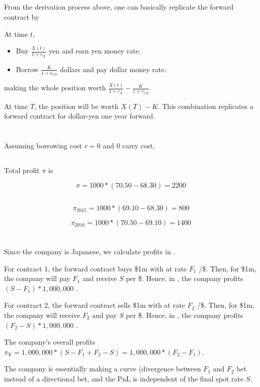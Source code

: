\documentclass[11pt]{scrartcl}
\begin{document}
\subsection{}

From the derivation process above, one can basically replicate the forward contract by 

At time $t$,
\begin{itemize}
\item Buy $\frac{X(t)}{1+r_X}$ yen and earn yen money rate.
\item Borrow $\frac{K}{1+r_{US}}$ dollars and pay dollar money rate.
\end{itemize}
making the whole position worth $\frac{X(t)}{1+r_X} - \frac{K}{1+r_{US}}$.

At time $T$, the position will be worth $X(T) - K$. This combination replicates a forward contract for dollar-yen one year forward.

\section{}

Assuming borrowing cost $r = 0$ and 0 carry cost,

\subsection{}

Total profit $\pi$ is

\[\pi = 1000*(70.50-68.30) = 2200\]

\subsection{}

\[\pi_{2015} = 1000 * (69.10 - 68.30) = 800\]

\[\pi_{2016} = 1000 * (70.50 - 69.10) = 1400\]

\section{}

Since the company is Japanese, we calculate profits in \textyen.

For contract 1, the forward contract buys \$1m with \textyen at rate $F_1$ \textyen/\$. Then, for \$1m, the company will pay $F_1$ \textyen and receive $S$ \textyen per \$. Hence, in \textyen, the company profits $(S - F_1)*1,000,000$ \textyen.

For contract 2, the forward contract sells \$1m with \textyen at rate $F_2$ \textyen/\$. Then, for \$1m, the company will receive $F_2$ \textyen and pay $S$ \textyen per \$. Hence, in \textyen, the company profits $(F_2 - S)*1,000,000$ \textyen.

The company's overall profits $\pi_{\yen} = 1,000,000 * (S-F_1 + F_2 - S) = 1,000,000 * (F_2 - F_1)$\textyen.

The company is essentially making a curve (divergence between $F_1$ and $F_2$ bet instead of a directional bet, and the PnL is independent of the final spot rate $S$.
\end{document}
